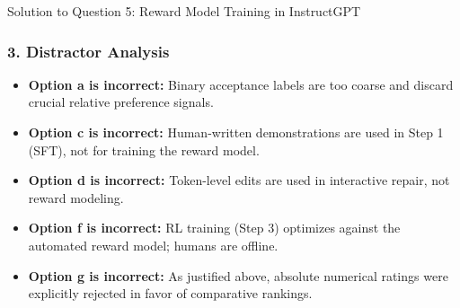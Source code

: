 \documentclass[11pt,a4paper]{article}
\begin{document}
\begin{solutionbox}{Solution to Question 5: Reward Model Training in InstructGPT}
\subsubsection*{3. Distractor Analysis}
\begin{itemize}[itemsep=2pt]
    \item \textbf{Option a is incorrect:} Binary acceptance labels are too coarse and discard crucial relative preference signals.
    \item \textbf{Option c is incorrect:} Human-written demonstrations are used in Step 1 (SFT), not for training the reward model.
    \item \textbf{Option d is incorrect:} Token-level edits are used in interactive repair, not reward modeling.
    \item \textbf{Option f is incorrect:} RL training (Step 3) optimizes against the automated reward model; humans are offline.
    \item \textbf{Option g is incorrect:} As justified above, absolute numerical ratings were explicitly rejected in favor of comparative rankings.
\end{itemize}
\end{solutionbox}

\vspace{10pt}
\end{document}
